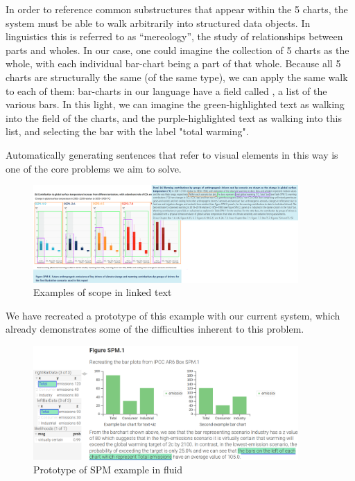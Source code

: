 In order to reference common substructures that appear within the 5 charts, the system must be able to walk arbitrarily 
into structured data objects. In linguistics this is referred to as ``mereology'', the study of relationships
between parts and wholes. In our case, one could imagine the collection of 5 charts as the whole, with each
individual bar-chart being a part of that whole. Because all 5 charts are structurally the same (of the same type),
we can apply the same walk to each of them: bar-charts in our language have a field called , a list
of the various bars. In this light, we can imagine the green-highlighted text as walking into the  field
of the charts, and the purple-highlighted text as walking into this list, and selecting the bar with the label "total warming".

Automatically generating sentences that refer to visual elements in this way is one of the core problems we aim to solve.

\begin{figure}
   \includegraphics[width=0.9\textwidth]{fig/ipcc-visual-elements.png}
   \caption{Examples of scope in linked text}
   \label{fig:visual-element-scope}
\end{figure}



We have recreated a prototype of this example with our current system, which already demonstrates
some of the difficulties inherent to this problem.

\begin{figure}
   \includegraphics[width=0.9\textwidth]{fig/figure-spm-fluid-mockup.png}
   \caption{Prototype of SPM example in fluid}
   \label{fig:figure-spm-fluid}
\end{figure}


